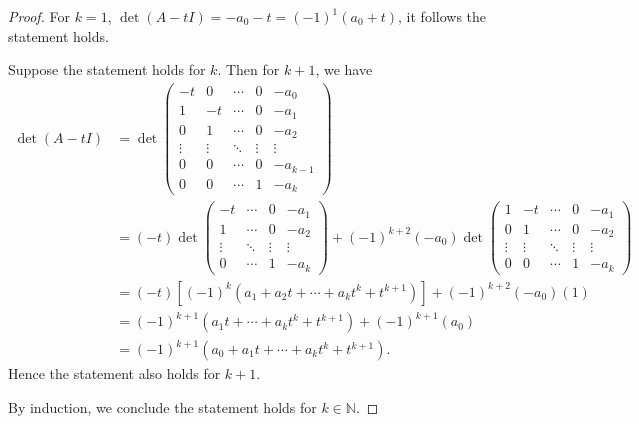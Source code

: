 \begin{Exercise}
\begin{proof}
For $k = 1$, $\det(A-t I) = -a_0 - t = (-1)^1(a_0 + t)$, it follows the statement holds.

Suppose the statement holds for $k$. Then for $k+1$, we have
\begin{align*}
\det(A-t I) 
&= \det\begin{pmatrix}
-t & 0 & \cdots & 0 & -a_0 \\
1 & -t & \cdots & 0 & -a_1 \\
0 & 1 & \cdots & 0 & -a_2 \\
\vdots & \vdots & \ddots & \vdots & \vdots \\
0 & 0 & \cdots & 0 & -a_{k-1} \\
0 & 0 & \cdots & 1 & -a_k
\end{pmatrix} \\
&= (-t)\det\begin{pmatrix}
-t & \cdots & 0 & -a_1 \\
1 & \cdots & 0 & -a_2 \\
\vdots & \ddots & \vdots & \vdots \\
0 & \cdots & 1 & -a_k
\end{pmatrix} + (-1)^{k+2} (-a_0) \det\begin{pmatrix}
1 & -t & \cdots & 0 & -a_1 \\
0 & 1 & \cdots & 0 & -a_2 \\
\vdots & \vdots & \ddots & \vdots & \vdots \\
0 & 0 & \cdots & 1 & -a_k
\end{pmatrix} \\
&= (-t)\left[(-1)^k(a_1+a_2 t+\cdots+a_{k}t^{k}+t^{k+1})\right] + (-1)^{k+2} (-a_0) (1) \\
&= (-1)^{k+1}(a_1 t+\cdots+a_k t^k+t^{k+1}) + (-1)^{k+1} (a_0) \\
&= (-1)^{k+1}(a_0 + a_1 t+\cdots+a_k t^k+t^{k+1}).
\end{align*}
Hence the statement also holds for $k+1$. 

By induction, we conclude the statement holds for $k\in\mathbb{N}$.
\end{proof}
\end{Exercise}